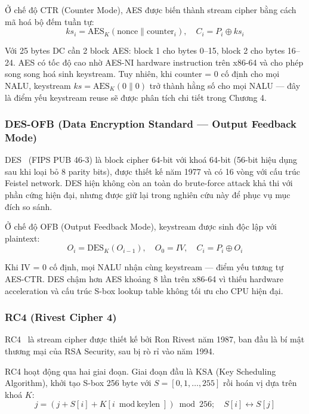 Ở chế độ CTR (Counter Mode), AES được biến thành stream cipher bằng cách mã hoá bộ đếm tuần tự:
\begin{equation}
ks_i = \text{AES}_K(\text{nonce} \| \text{counter}_i), \quad C_i = P_i \oplus ks_i
\end{equation}

Với 25 bytes DC cần 2 block AES: block 1 cho bytes 0--15, block 2 cho bytes 16--24. AES có tốc độ cao nhờ AES-NI hardware instruction trên x86-64 và cho phép song song hoá sinh keystream. Tuy nhiên, khi counter = 0 cố định cho mọi NALU, keystream $ks = \text{AES}_K(0 \| 0)$ trở thành hằng số cho mọi NALU --- đây là điểm yếu keystream reuse sẽ được phân tích chi tiết trong Chương 4.

\subsubsection{DES-OFB (Data Encryption Standard --- Output Feedback Mode)}

DES~\cite{fips_des} (FIPS PUB 46-3) là block cipher 64-bit với khoá 64-bit (56-bit hiệu dụng sau khi loại bỏ 8 parity bits), được thiết kế năm 1977 và có 16 vòng với cấu trúc Feistel network. DES hiện không còn an toàn do brute-force attack khả thi với phần cứng hiện đại, nhưng được giữ lại trong nghiên cứu này để phục vụ mục đích so sánh.

Ở chế độ OFB (Output Feedback Mode), keystream được sinh độc lập với plaintext:
\begin{equation}
O_i = \text{DES}_K(O_{i-1}), \quad O_0 = IV, \quad C_i = P_i \oplus O_i
\end{equation}

Khi IV = 0 cố định, mọi NALU nhận cùng keystream --- điểm yếu tương tự AES-CTR. DES chậm hơn AES khoảng 8 lần trên x86-64 vì thiếu hardware acceleration và cấu trúc S-box lookup table không tối ưu cho CPU hiện đại.

\subsubsection{RC4 (Rivest Cipher 4)}

RC4~\cite{rc4} là stream cipher được thiết kế bởi Ron Rivest năm 1987, ban đầu là bí mật thương mại của RSA Security, sau bị rò rỉ vào năm 1994.

RC4 hoạt động qua hai giai đoạn. Giai đoạn đầu là KSA (Key Scheduling Algorithm), khởi tạo S-box 256 byte với $S = [0, 1, \ldots, 255]$ rồi hoán vị dựa trên khoá $K$:
\begin{equation}
j = (j + S[i] + K[i \bmod \text{keylen}]) \bmod 256; \quad S[i] \leftrightarrow S[j]
\end{equation}

